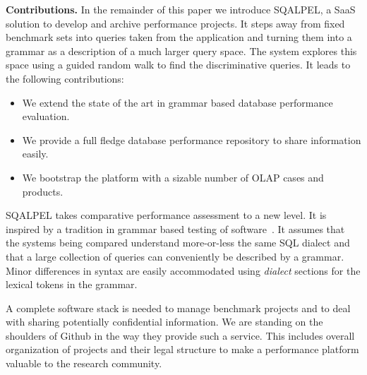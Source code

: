 \documentclass{cidr-2019}
\begin{document}
{\bf Contributions.} In the remainder of this paper we introduce {\sc
  SQALPEL}, a SaaS solution to develop and archive performance
projects.
It steps away from fixed benchmark sets into queries taken from the
application and turning them into a grammar as a description of a much
larger query space. The system explores this space using a guided
random walk to find the discriminative queries. It leads to the
following contributions:

\begin{itemize}
	\item We extend the state of the art in grammar based database
          performance evaluation.
	\item We provide a full fledge database performance repository
          to share information easily.
	\item We bootstrap the platform with a sizable number of OLAP
          cases and products.
\end{itemize}

{\sc SQALPEL} takes comparative performance assessment to a new
level. It is inspired by a tradition in grammar based testing of
software~\cite{10.1007/11754008_2}. It assumes that the systems being
compared understand more-or-less the same SQL dialect and that a large
collection of queries can conveniently be described by a
grammar. Minor differences in syntax are easily accommodated using
\emph{dialect} sections for the lexical tokens in the grammar.

A complete software stack is needed to manage benchmark projects and
to deal with sharing potentially confidential information. We are
standing on the shoulders of Github in the way they provide such a
service. This includes overall organization of projects and their
legal structure to make a performance platform valuable to the
research community.

\end{document}
